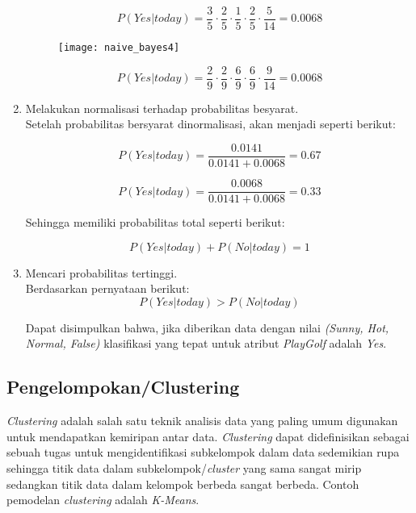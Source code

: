 \begin{enumerate}
\begin{equation}
P(Yes|today) = \frac{3}{5} \cdot \frac{2}{5} \cdot \frac{1}{5} \cdot \frac{2}{5} \cdot \frac{5}{14} = 0.0068
\end{equation}

\begin{figure}[H]
	\centering
	\texttt{[image: naive\_bayes4]}
	\label{fig:naive_bayes4}
\end{figure}

\begin{equation}
P(Yes|today) = \frac{2}{9} \cdot \frac{2}{9} \cdot \frac{6}{9} \cdot \frac{6}{9} \cdot \frac{9}{14} = 0.0068
\end{equation}

\item Melakukan normalisasi terhadap probabilitas besyarat.\\

Setelah probabilitas bersyarat dinormalisasi, akan menjadi seperti berikut:

\begin{equation}
P(Yes|today) = \frac{0.0141}{0.0141 + 0.0068} = 0.67
\end{equation}

\begin{equation}
P(Yes|today) = \frac{0.0068}{0.0141 + 0.0068} = 0.33
\end{equation}

Sehingga memiliki probabilitas total seperti berikut:

\begin{equation}
P(Yes|today) + P(No|today) = 1
\end{equation}

\item Mencari probabilitas tertinggi.\\

Berdasarkan pernyataan berikut:
\begin{equation}
P(Yes|today) > P(No|today)
\end{equation}

\noindent Dapat disimpulkan bahwa, jika diberikan data dengan nilai \textit{(Sunny, Hot, Normal, False)} klasifikasi yang tepat untuk atribut \textit{PlayGolf} adalah \textit{Yes}.



\end{enumerate}

\newpage
\subsection{Pengelompokan/Clustering} 
\textit{Clustering} adalah salah satu teknik analisis data yang paling umum digunakan untuk mendapatkan kemiripan antar data. \textit{Clustering} dapat didefinisikan sebagai sebuah tugas untuk mengidentifikasi subkelompok dalam data sedemikian rupa sehingga titik data dalam subkelompok/\textit{cluster} yang sama sangat mirip sedangkan titik data dalam kelompok berbeda sangat berbeda. Contoh pemodelan \textit{clustering} adalah \textit{K-Means}.

